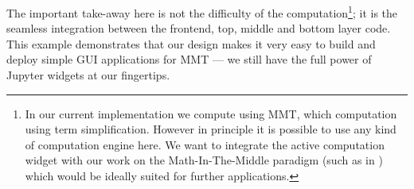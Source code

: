 The important take-away here is not the difficulty of the computation\footnote{
  In our current implementation we compute using MMT, which computation using term simplification. 
  However in principle it is possible to use any kind of computation engine here. 
  We want to integrate the active computation widget with our work on the Math-In-The-Middle paradigm (such as in \cite{ODK-D6.5}) which would be ideally suited for further applications. 
}; it is the seamless integration between the frontend, top, middle and bottom layer code. 
This example demonstrates that our design makes it very easy to build and deploy simple GUI applications for MMT --- we still have the full power of Jupyter widgets at our fingertips. 


